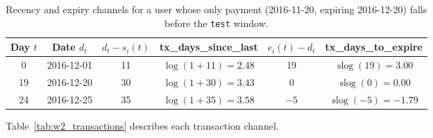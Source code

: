 \documentclass{article}
\newcommand{\slog}{\operatorname{slog}}
\begin{document}
\begin{table}[H]
\centering
\renewcommand{\arraystretch}{1.3}
\begin{tabular}{|c|c|c|c|c|c|}
\hline
\textbf{Day $t$} & \textbf{Date $d_t$} & $d_t - s_i(t)$ & \textbf{tx\_days\_since\_last} & $e_i(t) - d_t$ & \textbf{tx\_days\_to\_expire} \\ \hline
0  & 2016-12-01 & 11 & $\log(1 + 11) = 2.48$ & 19  & $\slog(19) = 3.00$ \\ \hline
19 & 2016-12-20 & 30 & $\log(1 + 30) = 3.43$ & 0   & $\slog(0) = 0.00$ \\ \hline
24 & 2016-12-25 & 35 & $\log(1 + 35) = 3.58$ & $-5$ & $\slog(-5) = -1.79$ \\ \hline
\end{tabular}
\caption{Recency and expiry channels for a user whose only payment (2016-11-20, expiring 2016-12-20) falls before the \texttt{test} window.}
\label{tab:w2_example}
\end{table}

Table~\ref{tab:w2_transactions} describes each transaction channel.
\end{document}
